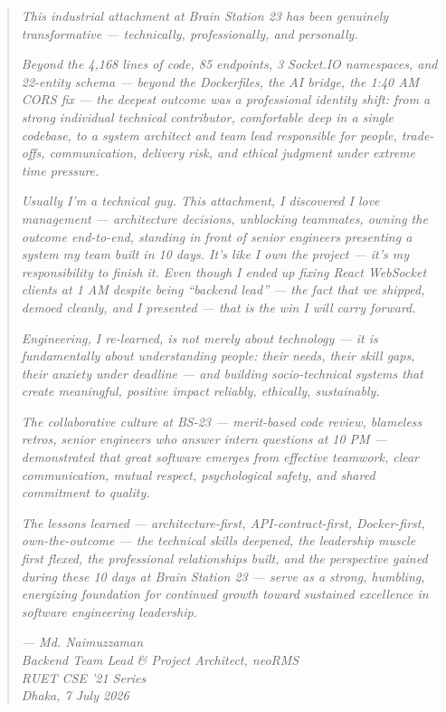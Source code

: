 \begin{quote}
\textit{This industrial attachment at Brain Station 23 has been genuinely transformative --- technically, professionally, and personally.}

\textit{Beyond the 4,168 lines of code, 85 endpoints, 3 Socket.IO namespaces, and 22-entity schema --- beyond the Dockerfiles, the AI bridge, the 1:40 AM CORS fix --- the deepest outcome was a professional identity shift: from a strong individual technical contributor, comfortable deep in a single codebase, to a system architect and team lead responsible for people, trade-offs, communication, delivery risk, and ethical judgment under extreme time pressure.}

\textit{Usually I'm a technical guy. This attachment, I discovered I love management --- architecture decisions, unblocking teammates, owning the outcome end-to-end, standing in front of senior engineers presenting a system my team built in 10 days. It's like I own the project --- it's my responsibility to finish it. Even though I ended up fixing React WebSocket clients at 1 AM despite being ``backend lead'' --- the fact that we shipped, demoed cleanly, and I presented --- that is the win I will carry forward.}

\textit{Engineering, I re-learned, is not merely about technology --- it is fundamentally about understanding people: their needs, their skill gaps, their anxiety under deadline --- and building socio-technical systems that create meaningful, positive impact reliably, ethically, sustainably.}

\textit{The collaborative culture at BS-23 --- merit-based code review, blameless retros, senior engineers who answer intern questions at 10 PM --- demonstrated that great software emerges from effective teamwork, clear communication, mutual respect, psychological safety, and shared commitment to quality.}

\textit{The lessons learned --- architecture-first, API-contract-first, Docker-first, own-the-outcome --- the technical skills deepened, the leadership muscle first flexed, the professional relationships built, and the perspective gained during these 10 days at Brain Station 23 --- serve as a strong, humbling, energizing foundation for continued growth toward sustained excellence in software engineering leadership.}

\textit{--- Md. Naimuzzaman}\\
\textit{Backend Team Lead \& Project Architect, neoRMS}\\
\textit{RUET CSE '21 Series}\\
\textit{Dhaka, 7 July 2026}
\end{quote}
